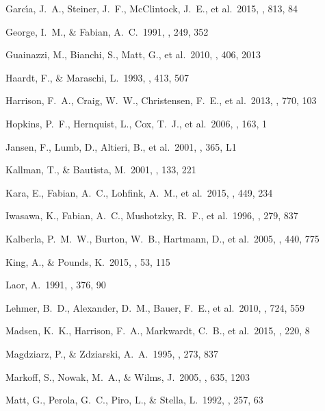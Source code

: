 \documentclass[]{emulateapj}
\begin{document}
\begin{thebibliography}{}
Garc{\'{\i}}a, J.~A., Steiner, J.~F., McClintock, J.~E., et al.\ 2015, \apj, 813, 84 

George, I.~M., \& Fabian, A.~C.\ 1991, \mnras, 249, 352

Guainazzi, M., Bianchi, S., Matt, G., et al.\ 2010, \mnras, 406, 2013 

Haardt, F., \& Maraschi, L.\ 1993, \apj, 413, 507

Harrison, F.~A., Craig, W.~W., Christensen, F.~E., et al.\ 2013, \apj, 770, 103

Hopkins, P.~F., Hernquist, L., Cox, T.~J., et al.\ 2006, \apjs, 163, 1 

Jansen, F., Lumb, D., Altieri, B., et al.\ 2001, \aap, 365, L1

Kallman, T., \& Bautista, M.\ 2001, \apjs, 133, 221 

Kara, E., Fabian, A.~C., Lohfink, A.~M., et al.\ 2015, \mnras, 449, 234 

 Iwasawa, K., Fabian, A.~C., Mushotzky, R.~F., et al.\ 1996, \mnras, 279, 837 
 
Kalberla, P.~M.~W., Burton, W.~B., Hartmann, D., et al.\ 2005, \aap, 440, 775  

King, A., \& Pounds, K.\ 2015, \araa, 53, 115 
 
Laor, A.\ 1991, \apj, 376, 90 

Lehmer, B.~D., Alexander, D.~M., Bauer, F.~E., et al.\ 2010, \apj, 724, 559 

 Madsen, K.~K., Harrison, F.~A., Markwardt, C.~B., et al.\ 2015, \apjs, 220, 8 

Magdziarz, P., \& Zdziarski, A.~A.\ 1995, \mnras, 273, 837 

Markoff, S., Nowak, M.~A., \& Wilms, J.\ 2005, \apj, 635, 1203 

Matt, G., Perola, G.~C., Piro, L., \& Stella, L.\ 1992, \aap, 257, 63 


\end{thebibliography}
\end{document}

